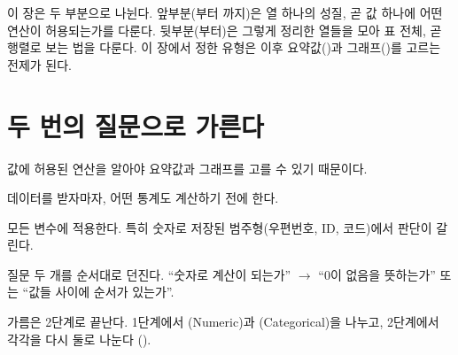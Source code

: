 이 장은 두 부분으로 나뉜다. 앞부분(부터
까지)은 열 하나의 성질, 곧 값 하나에 어떤 연산이
허용되는가를 다룬다. 뒷부분(부터)은 그렇게 정리한
열들을 모아 표 전체, 곧 행렬로 보는 법을 다룬다. 이 장에서 정한 유형은
이후 요약값()과 그래프()를
고르는 전제가 된다.

\section{두 번의 질문으로 가른다}
\label{sec:attr-flow}

\begin{inbrief}
  \item[Why] 값에 허용된 연산을 알아야 요약값과 그래프를 고를 수 있기 때문이다.
  \item[When] 데이터를 받자마자, 어떤 통계도 계산하기 전에 한다.
  \item[Where] 모든 변수에 적용한다. 특히 숫자로 저장된 범주형(우편번호, ID,
               코드)에서 판단이 갈린다.
  \item[How] 질문 두 개를 순서대로 던진다. ``숫자로 계산이 되는가'' $\to$
             ``0이 없음을 뜻하는가'' 또는 ``값들 사이에 순서가 있는가''.
\end{inbrief}

가름은 2단계로 끝난다. 1단계에서 (Numeric)과
(Categorical)을 나누고, 2단계에서 각각을 다시 둘로 나눈다
().

